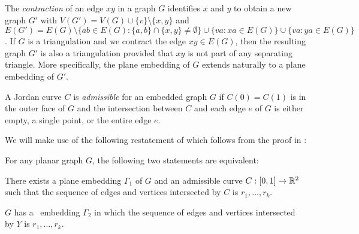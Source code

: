 The \emph{contraction} of an edge $xy$ in a graph $G$ identifies $x$ and $y$ to obtain a new graph $G'$ with
$V(G')=V(G)\cup\{v\}\setminus\{x,y\}$ and $E(G')=E(G)\setminus\{ab\in
E(G): \{a,b\}\cap\{x,y\}\neq\emptyset\}\cup\{va: xa\in E(G)\}\cup
\{va:ya\in E(G)\}$.  
If $G$ is a triangulation and we
contract the edge $xy\in E(G)$, then the resulting graph $G'$ is also
a triangulation provided that $xy$ is not part of any separating
triangle. More specifically, the plane embedding of $G$ extends naturally
to a plane embedding of $G'$.


A %
Jordan curve $C$ is \emph{admissible} for an
embedded graph $G$ if $C(0)=C(1)$ is in the outer face
of $G$ and the intersection between $C$ and each edge $e$ of $G$ is
either empty, a single point, or the entire edge $e$.  


We will make use of the following restatement of 
which follows from the proof in \cite{dalozzo.dujmovic.ea:drawing}:
\begin{thm}
	For any planar graph $G$, the following two statements are equivalent:
	\begin{compactenum}
		\item There exists a plane embedding $\Gamma_1$ of $G$ and an
		admissible curve $C:[0,1]\to\mathbb{R}^2$ such that the sequence of edges
		and vertices intersected by $C$ is $r_1,\ldots,r_k$.
		\item $G$ has a \Fary\ embedding $\Gamma_2$ in which the sequence
		of edges and vertices intersected by $Y$ is $r_1,\ldots,r_k$.
	\end{compactenum}
\end{thm}


